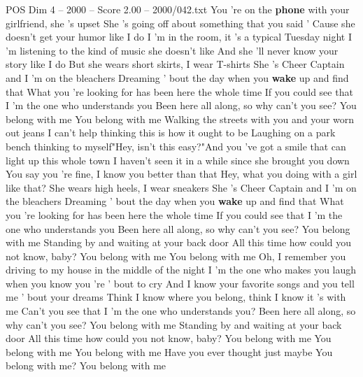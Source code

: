\begin{textsample}{POS Dim 4 – 2000 – Score 2.00 – 2000/042.txt}  \label{ex:f4_pos_006}
You 're on the \textbf{phone} with your girlfriend, she 's upset She 's going off about something that you said ' Cause she doesn't get your humor like I do I 'm in the room, it 's a typical Tuesday night I 'm listening to the kind of music she doesn't like And she 'll never know your story like I do But she wears short skirts, I wear T-shirts She 's Cheer Captain and I 'm on the bleachers Dreaming ' bout the day when you \textbf{wake} up and find that What you 're looking for has been here the whole time If you could see that I 'm the one who understands you Been here all along, so why can't you see?
You belong with me You belong with me Walking the streets with you and your worn out jeans I can't help thinking this is how it ought to be Laughing on a park bench thinking to myself"Hey, isn't this easy?"And you 've got a smile that can light up this whole town I haven't seen it in a while since she brought you down You say you 're fine, I know you better than that Hey, what you doing with a girl like that?
She wears high heels, I wear sneakers She 's Cheer Captain and I 'm on the bleachers Dreaming ' bout the day when you \textbf{wake} up and find that What you 're looking for has been here the whole time If you could see that I 'm the one who understands you Been here all along, so why can't you see?
You belong with me Standing by and waiting at your back door All this time how could you not know, baby?
You belong with me You belong with me Oh, I remember you driving to my house in the middle of the night I 'm the one who makes you laugh when you know you 're ' bout to cry And I know your favorite songs and you tell me ' bout your dreams Think I know where you belong, think I know it 's with me Can't you see that I 'm the one who understands you?
Been here all along, so why can't you see?
You belong with me Standing by and waiting at your back door All this time how could you not know, baby?
You belong with me You belong with me You belong with me Have you ever thought just maybe You belong with me?
You belong with me

\end{textsample}
